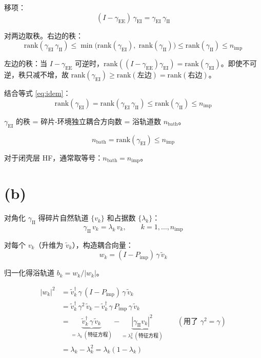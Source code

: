 \documentclass[11pt,a4paper]{article}
\begin{document}
移项：
\begin{equation}
  (I - \gamma_{\text{EE}})\,\gamma_{\text{EI}} = \gamma_{\text{EI}}\,\gamma_{\text{II}}
  \label{eq:idem}
\end{equation}

对两边取秩。右边的秩：
\begin{equation}
  \text{rank}(\gamma_{\text{EI}}\,\gamma_{\text{II}}) \leq \min\big(\text{rank}(\gamma_{\text{EI}}),\; \text{rank}(\gamma_{\text{II}})\big) \leq \text{rank}(\gamma_{\text{II}}) \leq n_{\text{imp}}
\end{equation}

左边的秩：当 $I - \gamma_{\text{EE}}$ 可逆时，$\text{rank}((I-\gamma_{\text{EE}})\gamma_{\text{EI}}) = \text{rank}(\gamma_{\text{EI}})$。即使不可逆，秩只减不增，故 $\text{rank}(\gamma_{\text{EI}}) \geq \text{rank}(\text{左边}) = \text{rank}(\text{右边})$。

结合等式 \eqref{eq:idem}：
\begin{equation}
  \text{rank}(\gamma_{\text{EI}}) = \text{rank}(\gamma_{\text{EI}}\,\gamma_{\text{II}}) \leq \text{rank}(\gamma_{\text{II}}) \leq n_{\text{imp}}
\end{equation}

$\gamma_{\text{EI}}$ 的秩 = 碎片-环境独立耦合方向数 = 浴轨道数 $n_{\text{bath}}$。

\begin{equation}
  \boxed{\;n_{\text{bath}} = \text{rank}(\gamma_{\text{EI}}) \leq n_{\text{imp}}\;}
\end{equation}

对于闭壳层 HF，通常取等号：$n_{\text{bath}} = n_{\text{imp}}$。

\section{(b)}

对角化 $\gamma_{\text{II}}$ 得碎片自然轨道 $\{v_k\}$ 和占据数 $\{\lambda_k\}$：
\begin{equation}
  \gamma_{\text{II}}\, v_k = \lambda_k\, v_k, \qquad k = 1, \ldots, n_{\text{imp}}
\end{equation}

对每个 $v_k$（升维为 $\tilde{v}_k$），构造耦合向量：
\begin{equation}
  w_k = (I - P_{\text{imp}})\,\gamma\,\tilde{v}_k
\end{equation}

归一化得浴轨道 $b_k = w_k / |w_k|$。

\begin{align}
  |w_k|^2 &= \tilde{v}_k^\dagger\, \gamma\, (I - P_{\text{imp}})\, \gamma\, \tilde{v}_k \\
  &= \tilde{v}_k^\dagger\, \gamma^2\, \tilde{v}_k - \tilde{v}_k^\dagger\, \gamma\, P_{\text{imp}}\, \gamma\, \tilde{v}_k \\
  &= \underbrace{\tilde{v}_k^\dagger\, \gamma\, \tilde{v}_k}_{= \lambda_k\ (\text{特征方程})} - \underbrace{|\gamma_{\text{II}} v_k|^2}_{= \lambda_k^2\ (\text{特征方程})} \qquad (\text{用了 } \gamma^2 = \gamma) \\
  &= \lambda_k - \lambda_k^2 = \lambda_k(1 - \lambda_k)
\end{align}
\end{document}
